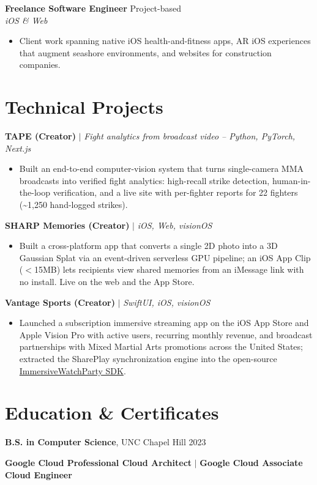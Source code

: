 \documentclass[10pt,letterpaper]{article}
\newcommand{\jobheader}[4]{
  \textbf{#1} \hfill #2 \\
  \textit{#3} \hfill \textit{#4}
  \vspace{-5pt}
}
\newcommand{\projectheader}[2]{
  \textbf{#1} $|$ \textit{#2}
  \vspace{-5pt}
}
\begin{document}
\jobheader{Freelance Software Engineer}{Project-based}{iOS \& Web}{}
\begin{itemize}
  \item Client work spanning native iOS health-and-fitness apps, AR iOS experiences that augment seashore environments, and websites for construction companies.
\end{itemize}

\section*{Technical Projects}

\projectheader{TAPE (Creator)}{Fight analytics from broadcast video -- Python, PyTorch, Next.js}
\begin{itemize}
  \item Built an end-to-end computer-vision system that turns single-camera MMA broadcasts into verified fight analytics: high-recall strike detection, human-in-the-loop verification, and a live site with per-fighter reports for 22 fighters (\textasciitilde 1,250 hand-logged strikes).
\end{itemize}

\projectheader{SHARP Memories (Creator)}{iOS, Web, visionOS}
\begin{itemize}
  \item Built a cross-platform app that converts a single 2D photo into a 3D Gaussian Splat via an event-driven serverless GPU pipeline; an iOS App Clip ($<$15MB) lets recipients view shared memories from an iMessage link with no install. Live on the web and the App Store.
\end{itemize}

\projectheader{Vantage Sports (Creator)}{SwiftUI, iOS, visionOS}
\begin{itemize}
  \item Launched a subscription immersive streaming app on the iOS App Store and Apple Vision Pro with active users, recurring monthly revenue, and broadcast partnerships with Mixed Martial Arts promotions across the United States; extracted the SharePlay synchronization engine into the open-source \href{https://github.com/Vantage-Kit/ImmersiveWatchParty-SDK}{ImmersiveWatchParty SDK}.
\end{itemize}

\section*{Education \& Certificates}

\textbf{B.S. in Computer Science}, UNC Chapel Hill \hfill 2023

\textbf{Google Cloud Professional Cloud Architect} $|$ \textbf{Google Cloud Associate Cloud Engineer}
\end{document}
